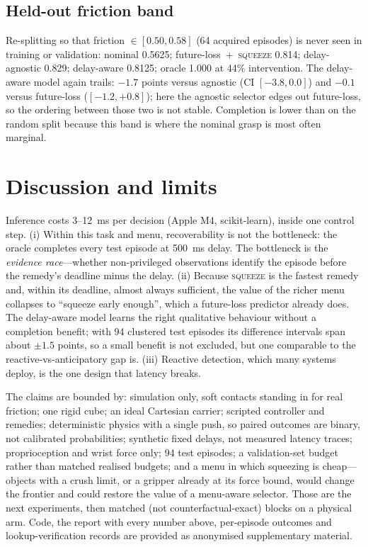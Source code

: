 \documentclass[conference]{IEEEtran}
\newcommand{\remedy}[1]{\textsc{#1}}
\begin{document}
\subsection{Held-out friction band}
Re-splitting so that friction $\in[0.50,0.58]$ (64 acquired episodes) is never seen in training or validation: nominal 0.5625; future-loss~+~\remedy{squeeze} 0.814; delay-agnostic 0.829; delay-aware 0.8125; oracle 1.000 at 44\% intervention. The delay-aware model again trails: $-1.7$ points versus agnostic (CI $[-3.8,0.0]$) and $-0.1$ versus future-loss ($[-1.2,+0.8]$); here the agnostic selector edges out future-loss, so the ordering between those two is not stable. Completion is lower than on the random split because this band is where the nominal grasp is most often marginal.

\section{Discussion and limits}
\label{sec:limits}
Inference costs 3--12~ms per decision (Apple M4, scikit-learn), inside one control step. (i) Within this task and menu, recoverability is not the bottleneck: the oracle completes every test episode at 500~ms delay. The bottleneck is the \emph{evidence race}---whether non-privileged observations identify the episode before the remedy's deadline minus the delay. (ii) Because \remedy{squeeze} is the fastest remedy and, within its deadline, almost always sufficient, the value of the richer menu collapses to ``squeeze early enough'', which a future-loss predictor already does. The delay-aware model learns the right qualitative behaviour without a completion benefit; with 94 clustered test episodes its difference intervals span about $\pm1.5$ points, so a small benefit is not excluded, but one comparable to the reactive-vs-anticipatory gap is. (iii) Reactive detection, which many systems deploy, is the one design that latency breaks.

The claims are bounded by: simulation only, soft contacts standing in for real friction; one rigid cube; an ideal Cartesian carrier; scripted controller and remedies; deterministic physics with a single push, so paired outcomes are binary, not calibrated probabilities; synthetic fixed delays, not measured latency traces; proprioception and wrist force only; 94 test episodes; a validation-set budget rather than matched realised budgets; and a menu in which squeezing is cheap---objects with a crush limit, or a gripper already at its force bound, would change the frontier and could restore the value of a menu-aware selector. Those are the next experiments, then matched (not counterfactual-exact) blocks on a physical arm. Code, the report with every number above, per-episode outcomes and lookup-verification records are provided as anonymised supplementary material.
\end{document}
